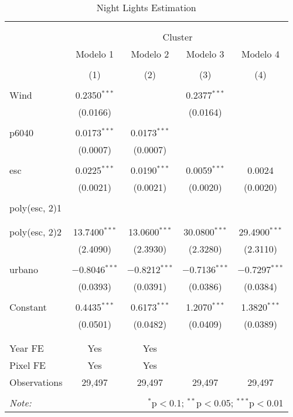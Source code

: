 
\begin{table}[!htbp] \centering 
  \caption{Night Lights Estimation} 
  \label{} 
\begin{tabular}{@{\extracolsep{5pt}}lcccc} 
\\[-1.8ex]\hline 
\hline \\[-1.8ex] 
\\[-1.8ex] & \multicolumn{4}{c}{Cluster} \\ 
 & Modelo 1 & Modelo 2 & Modelo 3 & Modelo 4 \\ 
\\[-1.8ex] & (1) & (2) & (3) & (4)\\ 
\hline \\[-1.8ex] 
 Wind & 0.2350$^{***}$ &  & 0.2377$^{***}$ &  \\ 
  & (0.0166) &  & (0.0164) &  \\ 
  & & & & \\ 
 p6040 & 0.0173$^{***}$ & 0.0173$^{***}$ &  &  \\ 
  & (0.0007) & (0.0007) &  &  \\ 
  & & & & \\ 
 esc & 0.0225$^{***}$ & 0.0190$^{***}$ & 0.0059$^{***}$ & 0.0024 \\ 
  & (0.0021) & (0.0021) & (0.0020) & (0.0020) \\ 
  & & & & \\ 
 poly(esc, 2)1 &  &  &  &  \\ 
  &  &  &  &  \\ 
  & & & & \\ 
 poly(esc, 2)2 & 13.7400$^{***}$ & 13.0600$^{***}$ & 30.0800$^{***}$ & 29.4900$^{***}$ \\ 
  & (2.4090) & (2.3930) & (2.3280) & (2.3110) \\ 
  & & & & \\ 
 urbano & $-$0.8046$^{***}$ & $-$0.8212$^{***}$ & $-$0.7136$^{***}$ & $-$0.7297$^{***}$ \\ 
  & (0.0393) & (0.0391) & (0.0386) & (0.0384) \\ 
  & & & & \\ 
 Constant & 0.4435$^{***}$ & 0.6173$^{***}$ & 1.2070$^{***}$ & 1.3820$^{***}$ \\ 
  & (0.0501) & (0.0482) & (0.0409) & (0.0389) \\ 
  & & & & \\ 
\hline \\[-1.8ex] 
Year FE & Yes & Yes &  &  \\ 
Pixel FE & Yes & Yes &  &  \\ 
Observations & 29,497 & 29,497 & 29,497 & 29,497 \\ 
\hline 
\hline \\[-1.8ex] 
\textit{Note:}  & \multicolumn{4}{r}{$^{*}$p$<$0.1; $^{**}$p$<$0.05; $^{***}$p$<$0.01} \\ 
\end{tabular} 
\end{table} 
